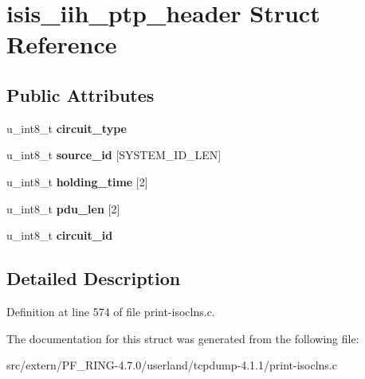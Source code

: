 \hypertarget{structisis__iih__ptp__header}{
\section{isis\_\-iih\_\-ptp\_\-header Struct Reference}
\label{structisis__iih__ptp__header}
}
\subsection*{Public Attributes}
\begin{DoxyCompactItemize}
\item 
\hypertarget{structisis__iih__ptp__header_ac7493b9fedb5fe969c8726190b3e9cb1}{
u\_\-int8\_\-t {\bfseries circuit\_\-type}}
\label{structisis__iih__ptp__header_ac7493b9fedb5fe969c8726190b3e9cb1}

\item 
\hypertarget{structisis__iih__ptp__header_a89de321effe1dfba0e892f2054f3e6de}{
u\_\-int8\_\-t {\bfseries source\_\-id} \mbox{[}SYSTEM\_\-ID\_\-LEN\mbox{]}}
\label{structisis__iih__ptp__header_a89de321effe1dfba0e892f2054f3e6de}

\item 
\hypertarget{structisis__iih__ptp__header_a03c369ecd2a2f734094e71a7d834c8be}{
u\_\-int8\_\-t {\bfseries holding\_\-time} \mbox{[}2\mbox{]}}
\label{structisis__iih__ptp__header_a03c369ecd2a2f734094e71a7d834c8be}

\item 
\hypertarget{structisis__iih__ptp__header_a6b29fa0daa624d0e6c3a8e94ed74db47}{
u\_\-int8\_\-t {\bfseries pdu\_\-len} \mbox{[}2\mbox{]}}
\label{structisis__iih__ptp__header_a6b29fa0daa624d0e6c3a8e94ed74db47}

\item 
\hypertarget{structisis__iih__ptp__header_a48f88cf52f4b36dbe453ce1d32c57276}{
u\_\-int8\_\-t {\bfseries circuit\_\-id}}
\label{structisis__iih__ptp__header_a48f88cf52f4b36dbe453ce1d32c57276}

\end{DoxyCompactItemize}


\subsection{Detailed Description}


Definition at line 574 of file print-\/isoclns.c.



The documentation for this struct was generated from the following file:\begin{DoxyCompactItemize}
\item 
src/extern/PF\_\-RING-\/4.7.0/userland/tcpdump-\/4.1.1/print-\/isoclns.c\end{DoxyCompactItemize}

